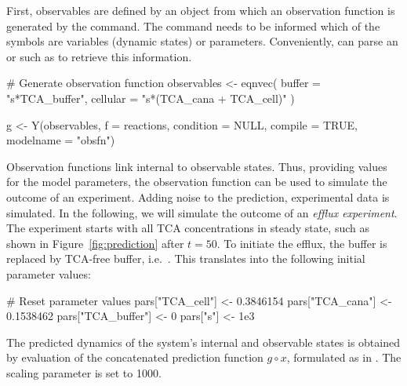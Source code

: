 \documentclass[article]{jss}
\begin{document}
First, observables are defined by an  object from which an observation function  is generated by the  command. The  command needs to be informed which of the symbols are variables (dynamic states) or parameters. Conveniently,  can parse an  or  such as  to retrieve this information.
\begin{CodeChunk}
\begin{CodeInput}
# Generate observation function
observables <- eqnvec(
  buffer = "s*TCA_buffer",
  cellular = "s*(TCA_cana + TCA_cell)"
)

g <- Y(observables, f = reactions, condition = NULL,
       compile = TRUE, modelname = "obsfn")

\end{CodeInput}
\end{CodeChunk}
Observation functions link internal to observable states. Thus, providing values for the model parameters, the observation function can be used to simulate the outcome of an experiment. Adding noise to the prediction, experimental data is simulated.
In the following, we will simulate the outcome of an \textit{efflux experiment}.
The experiment starts with all TCA concentrations in steady state, such as shown in Figure~\ref{fig:prediction} after $t = 50$. To initiate the efflux, the buffer is replaced by TCA-free buffer, i.e.~. This translates into the following initial parameter values:
\begin{CodeChunk}
\begin{CodeInput}
# Reset parameter values
pars["TCA_cell"] <- 0.3846154
pars["TCA_cana"] <- 0.1538462
pars["TCA_buffer"] <- 0
pars["s"] <- 1e3
\end{CodeInput}
\end{CodeChunk}
The predicted dynamics of the system's internal and observable states is obtained by evaluation of the concatenated prediction function $g\circ x$, formulated as  in . The scaling parameter  is set to 1000.
\end{document}
